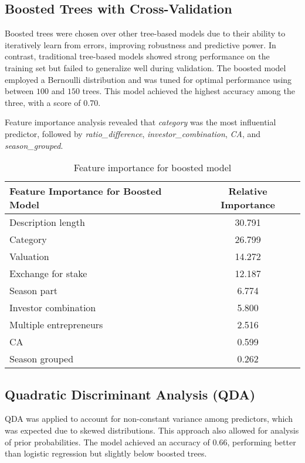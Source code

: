 \documentclass{article}
\begin{document}
\subsection{Boosted Trees with Cross-Validation}

Boosted trees were chosen over other tree-based models due to their ability to iteratively learn from errors, improving robustness and predictive power. In contrast, traditional tree-based models showed strong performance on the training set but failed to generalize well during validation. The boosted model employed a Bernoulli distribution and was tuned for optimal performance using between $100$ and $150$ trees. This model achieved the highest accuracy among the three, with a score of $0.70$.

Feature importance analysis revealed that \textit{category} was the most influential predictor, followed by \textit{ratio\_difference}, \textit{investor\_combination}, \textit{CA}, and \textit{season\_grouped}.

\begin{table}[H]
    \centering
    \begin{tabular}{lc}
        \hline
        \textbf{Feature Importance for Boosted Model} & \textbf{Relative Importance} \\ \hline
        Description length    & 30.791 \\
        Category              & 26.799 \\
        Valuation             & 14.272 \\
        Exchange for stake    & 12.187 \\
        Season part           & 6.774  \\
        Investor combination  & 5.800  \\
        Multiple entrepreneurs & 2.516 \\
        CA                    & 0.599  \\
        Season grouped        & 0.262  \\ \hline
    \end{tabular}
    \caption{Feature importance for boosted model}
    \label{tab:boosted_importance}
\end{table}


\subsection{Quadratic Discriminant Analysis (QDA)}

QDA was applied to account for non-constant variance among predictors, which was expected due to skewed distributions. This approach also allowed for analysis of prior probabilities. The model achieved an accuracy of $0.66$, performing better than logistic regression but slightly below boosted trees.
\end{document}

